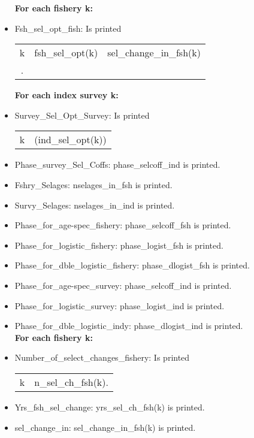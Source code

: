 \documentclass{article}
\begin{document}
\begin{itemize}
    \textbf{For each fishery k:}
    \item Fsh\_sel\_opt\_fish: Is printed 
    \begin{center}
        \begin{tabular}{c c c}
           k  &  fsh\_sel\_opt(k) & sel\_change\_in\_fsh(k)\\.
        \end{tabular}
    \end{center}
    \textbf{For each index survey k:}
    \item Survey\_Sel\_Opt\_Survey: Is printed
    \begin{center}
        \begin{tabular}{c c}
           k  &  (ind\_sel\_opt(k)) \\
        \end{tabular}
    \end{center}
    \item Phase\_survey\_Sel\_Coffs: phase\_selcoff\_ind is printed.
    \item Fshry\_Selages:  nselages\_in\_fsh is printed.
    \item Survy\_Selages: nselages\_in\_ind is printed.
    \item Phase\_for\_age-spec\_fishery: phase\_selcoff\_fsh is printed.
    \item Phase\_for\_logistic\_fishery: phase\_logist\_fsh is printed.
    \item Phase\_for\_dble\_logistic\_fishery: phase\_dlogist\_fsh is printed.
    \item Phase\_for\_age-spec\_survey: phase\_selcoff\_ind is printed.
    \item Phase\_for\_logistic\_survey: phase\_logist\_ind is printed.
    \item Phase\_for\_dble\_logistic\_indy:  phase\_dlogist\_ind is printed.\\

    \textbf{For each fishery k:}
    \item Number\_of\_select\_changes\_fishery: Is printed
    \begin{center}
        \begin{tabular}{c c}
            k & n\_sel\_ch\_fsh(k). \\
        \end{tabular}
    \end{center}
    \item Yrs\_fsh\_sel\_change: yrs\_sel\_ch\_fsh(k) is printed.
    \item sel\_change\_in: sel\_change\_in\_fsh(k) is printed.\\


\end{itemize}
\end{document}
